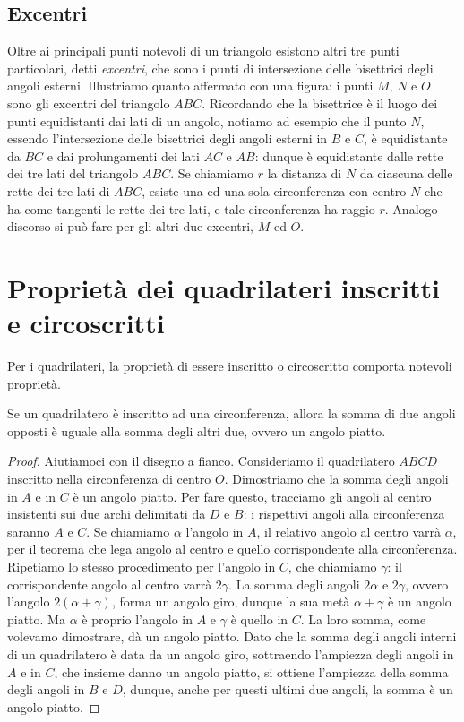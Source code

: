 \subsection{Excentri}

Oltre ai principali punti notevoli di un triangolo esistono altri tre punti particolari, detti \emph{excentri}, che sono i punti di intersezione delle bisettrici degli angoli esterni. Illustriamo quanto affermato con una figura: i punti $M$, $N$ e $O$ sono gli excentri del triangolo $ABC$. Ricordando che la bisettrice è il luogo dei punti equidistanti dai lati di un angolo, notiamo ad esempio che il punto $N$, essendo l'intersezione delle bisettrici degli angoli esterni in $B$ e $C$, è equidistante da $BC$ e dai prolungamenti dei lati $AC$ e $AB$: dunque è equidistante dalle rette dei tre lati del triangolo $ABC$. Se chiamiamo $r$ la distanza di $N$ da ciascuna delle rette dei tre lati di $ABC$, esiste una ed una sola circonferenza con centro $N$ che ha come tangenti le rette dei tre lati, e tale circonferenza ha raggio $r$. Analogo discorso si può fare per gli altri due excentri, $M$ ed $O$.


\section{Proprietà dei quadrilateri inscritti e circoscritti}

Per i quadrilateri, la proprietà di essere inscritto o circoscritto comporta notevoli proprietà.

\begin{teorema}
Se un quadrilatero è inscritto ad una circonferenza, allora la somma di due angoli opposti è uguale alla somma degli altri due, ovvero un angolo piatto.
\end{teorema}

\begin{proof}
Aiutiamoci con il disegno a fianco. Consideriamo il quadrilatero $ABCD$ inscritto nella circonferenza di centro $O$. Dimostriamo che la somma degli angoli in $A$ e in $C$ è un angolo piatto. Per fare questo, tracciamo gli angoli al centro insistenti sui due archi delimitati da $D$ e $B$: i rispettivi angoli alla circonferenza saranno $A$ e $C$. Se chiamiamo $\alpha$ l'angolo in $A$, il relativo angolo al centro varrà $\alpha$, per il teorema che lega angolo al centro e quello corrispondente alla circonferenza. Ripetiamo lo stesso procedimento per l'angolo in $C$, che chiamiamo $\gamma$: il corrispondente angolo al centro varrà $2\gamma$. La somma degli angoli $2\alpha$ e $2\gamma$, ovvero l'angolo $2(\alpha+\gamma)$, forma un angolo giro, dunque la sua metà $\alpha+\gamma$ è un angolo piatto. Ma $\alpha$ è proprio l'angolo in $A$ e $\gamma$ è quello in $C$. La loro somma, come volevamo dimostrare, dà un angolo piatto. Dato che la somma degli angoli interni di un quadrilatero è data da un angolo giro, sottraendo l'ampiezza degli angoli in $A$ e in $C$, che insieme danno un angolo piatto, si ottiene l'ampiezza della somma degli angoli in $B$ e $D$, dunque, anche per questi ultimi due angoli, la somma è un angolo piatto.
\end{proof}

